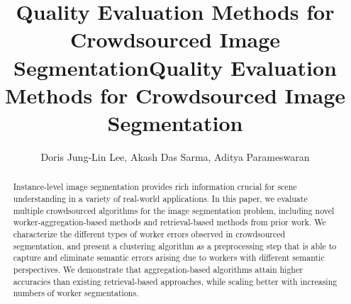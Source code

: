 \documentclass[letterpaper]{article} %
\title{Quality Evaluation Methods for Crowdsourced Image Segmentation}
\begin{document}
           \title{Quality Evaluation Methods for Crowdsourced Image Segmentation}
           \author{Doris Jung-Lin Lee, Akash Das Sarma, Aditya Parameswaran}
           \maketitle
           \begin{abstract}
           Instance-level image segmentation provides rich information crucial for scene understanding in a variety of real-world applications. In this paper, we evaluate multiple crowdsourced algorithms for the image segmentation problem, including novel worker-aggregation-based methods and retrieval-based methods from prior work. We characterize the different types of worker errors observed in crowdsourced segmentation, and present a clustering algorithm as a preprocessing step that is able to capture and eliminate semantic errors arising due to workers with different semantic perspectives. We demonstrate that aggregation-based algorithms attain higher accuracies than existing retrieval-based approaches, while scaling better with increasing numbers of worker segmentations. 
          \end{abstract}
               
          
          
          
          
          
          
          


\end{document}
